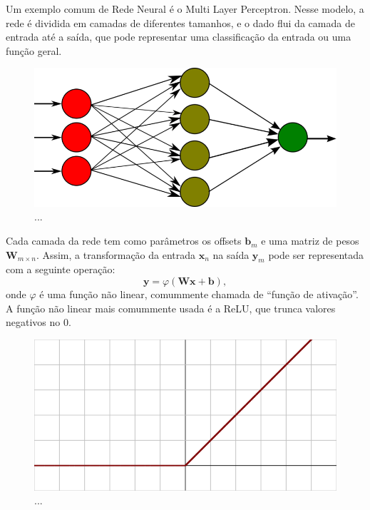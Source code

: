 Um exemplo comum de Rede Neural é o Multi Layer
Perceptron. Nesse modelo, a rede é dividida
em camadas de diferentes tamanhos, e o dado
flui da camada de entrada até a saída,
que pode representar uma classificação
da entrada ou uma função geral.


\begin{figure}[!ht]
	\centering
	\includegraphics[width=\linewidth*2/3]{files/assets/deeplearning/mlp.png}
	\caption{...}
	\label{img:preview}
\end{figure}


Cada camada da rede tem como parâmetros os offsets 
$\mathbf{b}_m$ e uma matriz de pesos $\mathbf{W}_{m\times n}$.
Assim, a transformação da entrada $\mathbf{x}_n$ na saída
$\mathbf{y}_m$ pode ser representada com a seguinte operação:
\begin{equation}
	\mathbf{y} = 
	\varphi\left( \mathbf{W}\mathbf{x} + \mathbf{b} \right),
\end{equation}
onde $\varphi$ é uma função não linear, comummente chamada
de ``função de ativação''. A função não linear
mais comummente usada é a ReLU, que trunca valores
negativos no $0$.

\begin{figure}[!ht]
	\centering
	\includegraphics[width=\linewidth*2/3]{files/assets/deeplearning/relu.png}
	\caption{...}
	\label{img:preview}
\end{figure}

